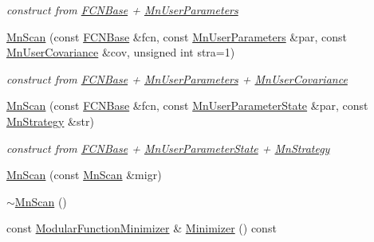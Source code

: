 \begin{DoxyCompactItemize}
\begin{DoxyCompactList}\small\item\em construct from \mbox{\hyperlink{classROOT_1_1Minuit2_1_1FCNBase}{F\+C\+N\+Base}} + \mbox{\hyperlink{classROOT_1_1Minuit2_1_1MnUserParameters}{Mn\+User\+Parameters}} \end{DoxyCompactList}\item 
\mbox{\hyperlink{classROOT_1_1Minuit2_1_1MnScan_a0152e76b39c1aa0c13dc8ed389f8d2cf}{Mn\+Scan}} (const \mbox{\hyperlink{classROOT_1_1Minuit2_1_1FCNBase}{F\+C\+N\+Base}} \&fcn, const \mbox{\hyperlink{classROOT_1_1Minuit2_1_1MnUserParameters}{Mn\+User\+Parameters}} \&par, const \mbox{\hyperlink{classROOT_1_1Minuit2_1_1MnUserCovariance}{Mn\+User\+Covariance}} \&cov, unsigned int stra=1)
\begin{DoxyCompactList}\small\item\em construct from \mbox{\hyperlink{classROOT_1_1Minuit2_1_1FCNBase}{F\+C\+N\+Base}} + \mbox{\hyperlink{classROOT_1_1Minuit2_1_1MnUserParameters}{Mn\+User\+Parameters}} + \mbox{\hyperlink{classROOT_1_1Minuit2_1_1MnUserCovariance}{Mn\+User\+Covariance}} \end{DoxyCompactList}\item 
\mbox{\hyperlink{classROOT_1_1Minuit2_1_1MnScan_a19bfbbf98648f6ad165a18279cc3e19b}{Mn\+Scan}} (const \mbox{\hyperlink{classROOT_1_1Minuit2_1_1FCNBase}{F\+C\+N\+Base}} \&fcn, const \mbox{\hyperlink{classROOT_1_1Minuit2_1_1MnUserParameterState}{Mn\+User\+Parameter\+State}} \&par, const \mbox{\hyperlink{classROOT_1_1Minuit2_1_1MnStrategy}{Mn\+Strategy}} \&str)
\begin{DoxyCompactList}\small\item\em construct from \mbox{\hyperlink{classROOT_1_1Minuit2_1_1FCNBase}{F\+C\+N\+Base}} + \mbox{\hyperlink{classROOT_1_1Minuit2_1_1MnUserParameterState}{Mn\+User\+Parameter\+State}} + \mbox{\hyperlink{classROOT_1_1Minuit2_1_1MnStrategy}{Mn\+Strategy}} \end{DoxyCompactList}\item 
\mbox{\hyperlink{classROOT_1_1Minuit2_1_1MnScan_ab4e017c0919d43eaa2f19e5c5a1a9f9a}{Mn\+Scan}} (const \mbox{\hyperlink{classROOT_1_1Minuit2_1_1MnScan}{Mn\+Scan}} \&migr)
\item 
\mbox{\hyperlink{classROOT_1_1Minuit2_1_1MnScan_ab51a420d238808cf195aafb0c0e29269}{$\sim$\+Mn\+Scan}} ()
\item 
const \mbox{\hyperlink{classROOT_1_1Minuit2_1_1ModularFunctionMinimizer}{Modular\+Function\+Minimizer}} \& \mbox{\hyperlink{classROOT_1_1Minuit2_1_1MnScan_a9bebaf56360ff70aac6f47590227d8b5}{Minimizer}} () const

\end{DoxyCompactItemize}
